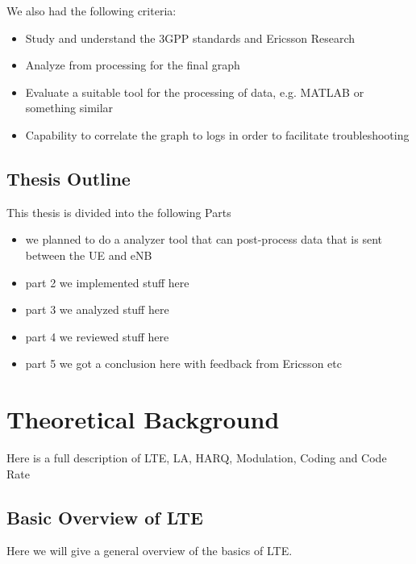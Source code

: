 \documentclass[cropmarks, frame, english]{idamasterthesis}
\begin{document}
\setlength{\parindent}{0cm} We also had the following criteria: 
 \begin{itemize} 
 \item Study and understand the 3GPP standards and Ericsson Research
 \item Analyze from processing for the final graph
 \item Evaluate a suitable tool for the processing of data, e.g. MATLAB or something similar
 \item Capability to correlate the graph to logs in order to facilitate troubleshooting
 \end{itemize}


\section{Thesis Outline}
This thesis is divided into the following Parts
\begin{itemize}
	\item we planned to do a analyzer tool that can post-process data that is sent between the UE and eNB
	\item part 2 we implemented stuff here
	\item part 3 we analyzed  stuff here
	\item part 4 we reviewed stuff here
	\item part 5 we got a conclusion here with feedback from Ericsson etc
\end{itemize}

\chapter{Theoretical Background}
Here is a full description of LTE, LA, HARQ, Modulation, Coding and Code Rate

\section{Basic Overview of LTE}
Here we will give a general overview of the basics of LTE.
\end{document}
